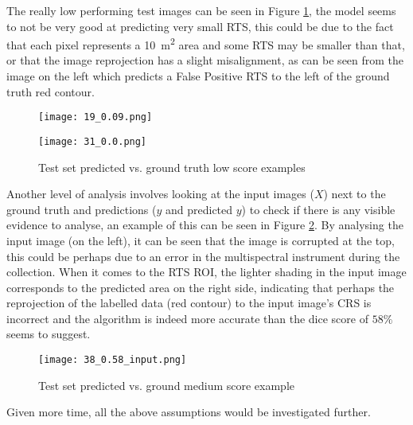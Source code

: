  The really low performing test images can be seen in Figure \ref{low_score_pic}, the model seems to not be very good at predicting very small \gls{RTS}, this could be due to the fact that each pixel represents a \SI{10}{\metre\squared} area and some \gls{RTS} may be smaller than that, or that the image reprojection has a slight misalignment, as can be seen from the image on the left which predicts a False Positive \gls{RTS} to the left of the ground truth red contour.
    \begin{figure}[htp]
        \begin{minipage}[c]{0.45\linewidth}
        \texttt{[image: 19\_0.09.png]}
        \end{minipage}
            \hfill
            \begin{minipage}[c]{0.45\linewidth}
            \texttt{[image: 31\_0.0.png]}
        \end{minipage}
        \caption{Test set predicted vs. ground truth low score examples} \label{low_score_pic}
    \end{figure}

Another level of analysis involves looking at the input images ($X$) next to the ground truth and predictions ($y$ and predicted $y$) to check if there is any visible evidence to analyse, an example of this can be seen in Figure \ref{medium_score_input_pic}. By analysing the input image (on the left), it can be seen that the image is corrupted at the top, this could be perhaps due to an error in the multispectral instrument during the collection. When it comes to the \gls{RTS} \gls{ROI}, the lighter shading in the input image corresponds to the predicted area on the right side, indicating that perhaps the reprojection of the labelled data (red contour) to the input image's \gls{CRS} is incorrect and the algorithm is indeed more accurate than the dice score of $58\%$ seems to suggest.
\begin{figure}[htp]
    \centering
    \texttt{[image: 38\_0.58\_input.png]}
    \caption{Test set predicted vs. ground medium score example}
    \label{medium_score_input_pic}
\end{figure}

Given more time, all the above assumptions would be investigated further.
